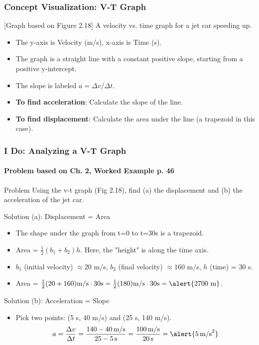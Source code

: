 \documentclass{beamer}
\begin{document}
\begin{frame}
\frametitle{Concept Visualization: V-T Graph}
\begin{alertblock}{[Graph based on Figure 2.18]}
A velocity vs. time graph for a jet car speeding up.
\begin{itemize}
    \item The y-axis is Velocity (m/s), x-axis is Time (s).
    \item The graph is a straight line with a constant positive slope, starting from a positive y-intercept.
    \item The slope is labeled $a = \Delta v / \Delta t$.
\end{itemize}
\end{alertblock}
\pause
\begin{itemize}
    \item \textbf{To find acceleration}: Calculate the \alert{slope} of the line.
    \item \textbf{To find displacement}: Calculate the \alert{area under the line} (a trapezoid in this case).
\end{itemize}
\end{frame}

\begin{frame}
\frametitle{I Do: Analyzing a V-T Graph}
\framesubtitle{Problem based on Ch. 2, Worked Example p. 46}
\begin{block}{Problem}
Using the v-t graph (Fig 2.18), find (a) the displacement and (b) the acceleration of the jet car.
\end{block}
\pause
\begin{block}{Solution (a): Displacement = Area}
\begin{itemize}
    \item The shape under the graph from t=0 to t=30s is a trapezoid.
    \item Area = $\frac{1}{2}(b_1 + b_2)h$. Here, the "height" is along the time axis.
    \item $b_1$ (initial velocity) $\approx 20$ m/s, $b_2$ (final velocity) $\approx 160$ m/s, $h$ (time) = 30 s.
    \item Area = $\frac{1}{2}(20 + 160)\text{m/s} \cdot 30\text{s} = \frac{1}{2}(180)\text{m/s} \cdot 30\text{s} = \alert{2700 \text{ m}}$.
\end{itemize}
\end{block}
\end{frame}

\begin{frame}
\begin{block}{Solution (b): Acceleration = Slope}
\begin{itemize}
    \item Pick two points: (5 s, 40 m/s) and (25 s, 140 m/s).
    \[ a = \frac{\Delta v}{\Delta t} = \frac{140 - 40 \, \text{m/s}}{25 - 5 \, \text{s}} = \frac{100 \, \text{m/s}}{20 \, \text{s}} = \alert{5 \, \text{m/s}^2} \]
\end{itemize}
\end{block}
\end{frame}
\end{document}
